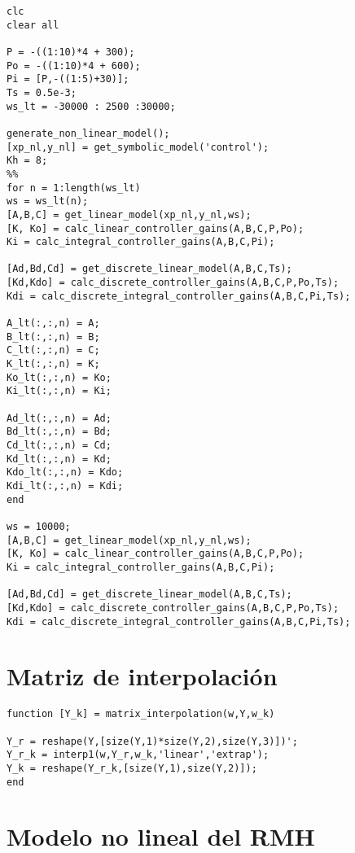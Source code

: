 \begin{lstlisting}[frame=single]
clc
clear all

P = -((1:10)*4 + 300);
Po = -((1:10)*4 + 600); 
Pi = [P,-((1:5)+30)];
Ts = 0.5e-3;
ws_lt = -30000 : 2500 :30000;

generate_non_linear_model();
[xp_nl,y_nl] = get_symbolic_model('control');
Kh = 8;
%%
for n = 1:length(ws_lt)
ws = ws_lt(n);
[A,B,C] = get_linear_model(xp_nl,y_nl,ws);
[K, Ko] = calc_linear_controller_gains(A,B,C,P,Po);
Ki = calc_integral_controller_gains(A,B,C,Pi);

[Ad,Bd,Cd] = get_discrete_linear_model(A,B,C,Ts);
[Kd,Kdo] = calc_discrete_controller_gains(A,B,C,P,Po,Ts);
Kdi = calc_discrete_integral_controller_gains(A,B,C,Pi,Ts);

A_lt(:,:,n) = A; 
B_lt(:,:,n) = B;
C_lt(:,:,n) = C;
K_lt(:,:,n) = K;
Ko_lt(:,:,n) = Ko;
Ki_lt(:,:,n) = Ki;

Ad_lt(:,:,n) = Ad; 
Bd_lt(:,:,n) = Bd;
Cd_lt(:,:,n) = Cd;
Kd_lt(:,:,n) = Kd;
Kdo_lt(:,:,n) = Kdo;
Kdi_lt(:,:,n) = Kdi;
end

ws = 10000;
[A,B,C] = get_linear_model(xp_nl,y_nl,ws);
[K, Ko] = calc_linear_controller_gains(A,B,C,P,Po);
Ki = calc_integral_controller_gains(A,B,C,Pi);

[Ad,Bd,Cd] = get_discrete_linear_model(A,B,C,Ts);
[Kd,Kdo] = calc_discrete_controller_gains(A,B,C,P,Po,Ts);
Kdi = calc_discrete_integral_controller_gains(A,B,C,Pi,Ts);

\end{lstlisting}



\section{Matriz de interpolaci\'on}

\begin{lstlisting}[frame=single]
function [Y_k] = matrix_interpolation(w,Y,w_k)

Y_r = reshape(Y,[size(Y,1)*size(Y,2),size(Y,3)])';
Y_r_k = interp1(w,Y_r,w_k,'linear','extrap');
Y_k = reshape(Y_r_k,[size(Y,1),size(Y,2)]);
end
\end{lstlisting}

\section{Modelo no lineal del RMH} \label{ap:sistema-ecuaciones-no-lineal}

